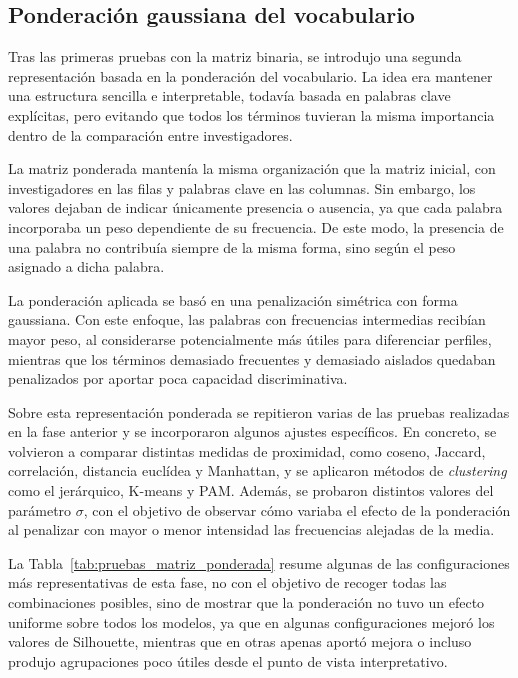 \documentclass[11pt,spanish,listoffigures,listoftables]{tfgetsinf}
\begin{document}
\subsection{Ponderación gaussiana del vocabulario}

Tras las primeras pruebas con la matriz binaria, se introdujo una segunda representación basada en la ponderación del vocabulario. La idea era mantener una estructura sencilla e interpretable, todavía basada en palabras clave explícitas, pero evitando que todos los términos tuvieran la misma importancia dentro de la comparación entre investigadores.

La matriz ponderada mantenía la misma organización que la matriz inicial, con investigadores en las filas y palabras clave en las columnas. Sin embargo, los valores dejaban de indicar únicamente presencia o ausencia, ya que cada palabra incorporaba un peso dependiente de su frecuencia. De este modo, la presencia de una palabra no contribuía siempre de la misma forma, sino según el peso asignado a dicha palabra.

La ponderación aplicada se basó en una penalización simétrica con forma gaussiana. Con este enfoque, las palabras con frecuencias intermedias recibían mayor peso, al considerarse potencialmente más útiles para diferenciar perfiles, mientras que los términos demasiado frecuentes y demasiado aislados quedaban penalizados por aportar poca capacidad discriminativa.

Sobre esta representación ponderada se repitieron varias de las pruebas realizadas en la fase anterior y se incorporaron algunos ajustes específicos. En concreto, se volvieron a comparar distintas medidas de proximidad, como coseno, Jaccard, correlación, distancia euclídea y Manhattan, y se aplicaron métodos de \textit{clustering} como el jerárquico, K-means y PAM. Además, se probaron distintos valores del parámetro \(\sigma\), con el objetivo de observar cómo variaba el efecto de la ponderación al penalizar con mayor o menor intensidad las frecuencias alejadas de la media.

La Tabla~\ref{tab:pruebas_matriz_ponderada} resume algunas de las configuraciones más representativas de esta fase, no con el objetivo de recoger todas las combinaciones posibles, sino de mostrar que la ponderación no tuvo un efecto uniforme sobre todos los modelos, ya que en algunas configuraciones mejoró los valores de Silhouette, mientras que en otras apenas aportó mejora o incluso produjo agrupaciones poco útiles desde el punto de vista interpretativo.
\end{document}
